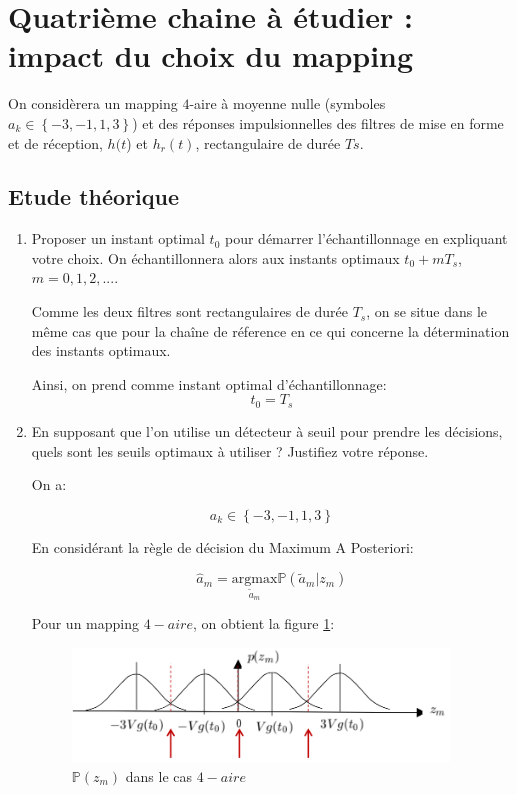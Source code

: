 \documentclass[frenchb]{article}
\begin{document}
\section{Quatrième chaine à étudier : impact du choix du mapping}
On considèrera un mapping $4$-aire à moyenne nulle (symboles $a_k \in \left\{-3, -1, 1, 3\right\}$) et des réponses impulsionnelles des filtres de mise en forme et de réception, $h(t$) et $h_r(t)$, rectangulaire de durée $Ts$.

\subsection{Etude théorique}

    \begin{enumerate}
        \item Proposer un instant optimal $t_0$ pour démarrer l'échantillonnage en expliquant votre choix. On échantillonnera alors aux instants optimaux $t_0+mT_s$, $m=0, 1, 2, ...$.
        \par\leavevmode\par
        \setlength\parindent{0.5cm}
        Comme les deux filtres sont rectangulaires de durée $T_s$, on se situe dans le même cas que pour la chaîne de réference en ce qui concerne la détermination des instants optimaux. 
        
        Ainsi, on prend comme instant optimal d'échantillonnage:
        $$
        \boxed{t_0 = T_s}
        $$
        
        \item En supposant que l'on utilise un détecteur à seuil pour prendre les décisions, quels sont les seuils optimaux à utiliser ? Justifiez votre réponse.
        
        \par\leavevmode\par
        \setlength\parindent{0.5cm}
        On a:
        
        $$a_k \in \left\{-3, -1, 1, 3\right\}$$
        
        En considérant la règle de décision du Maximum A Posteriori: 
         
        $$ \hat{a}_m = \underset{\tilde{a}_m}{\mathrm{argmax}} \mathbb{P}(\tilde{a}_m|z_m)$$
        
        Pour un mapping $4-aire$, on obtient la figure \ref{fig : 4_aire proba}: 
        
        \begin{figure}[ht!]
        \centering
        \includegraphics[width=10cm]{4_aire_proba.png}
        \caption{$\mathbb{P}(z_m)$ dans le cas $4-aire$ \label{fig : 4_aire proba}}
        \end{figure}
        

\end{enumerate}
\end{document}
